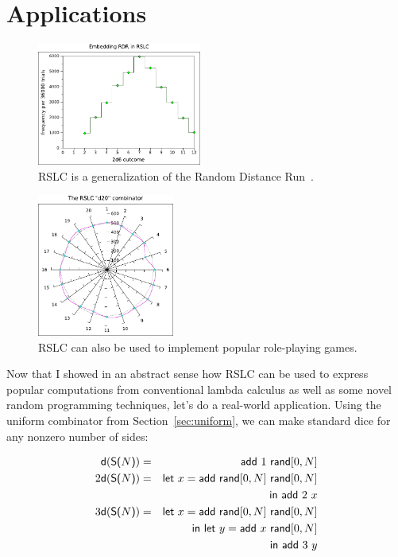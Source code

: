 \documentclass[10pt]{sigplanconf}
\begin{document}
\section{Applications}

\begin{figure}[t]
	\begin{center}
	\includegraphics[width=0.48\textwidth]{rslc-rdr.pdf}
	\end{center}
	\caption{RSLC is a generalization of the Random Distance Run~\cite{rdr}.}
	\label{fig:rdr}
\end{figure}

\begin{figure}[t]
	\begin{center}
	\includegraphics[width=0.40\textwidth]{rslc-d20.pdf}
	\end{center}
	\caption{RSLC can also be used to implement popular role-playing games.}
	\label{fig:d20}
\end{figure}

Now that I showed in an abstract sense how RSLC can be used to express popular computations from conventional lambda calculus as well as some novel random programming techniques, let's do a real-world application.
Using the uniform combinator from Section~\ref{sec:uniform}, we can make standard dice for any nonzero number of sides:

\begin{eqnarray*}
	\mathsf{d}(\textsf{S(}N\textsf{)}) &=& \mathsf{add}~1~\mathsf{rand}[0,N] \\
       2\mathsf{d}(\textsf{S(}N\textsf{)}) &=& \mathsf{let}~x=\mathsf{add}~\mathsf{rand}[0,N]~\mathsf{rand}[0,N] \\
	&& \mathsf{in}~\mathsf{add}~2~x \\
       3\mathsf{d}(\textsf{S(}N\textsf{)}) &=& \mathsf{let}~x=\mathsf{add}~\mathsf{rand}[0,N]~\mathsf{rand}[0,N] \\
	&& \mathsf{in}~\mathsf{let}~y=\mathsf{add}~x~\mathsf{rand}[0,N] \\
	&& \mathsf{in}~\mathsf{add}~3~y
\end{eqnarray*}
\end{document}
